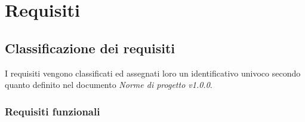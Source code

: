 \documentclass[AnalisiDeiRequisiti.tex]{subfiles}
\begin{document}

\chapter{Requisiti}
\section{Classificazione dei requisiti}
I requisiti vengono classificati ed assegnati loro un identificativo univoco secondo quanto definito nel documento \textit{Norme di progetto v1.0.0}.


\subsection{Requisiti funzionali}
\end{document}
